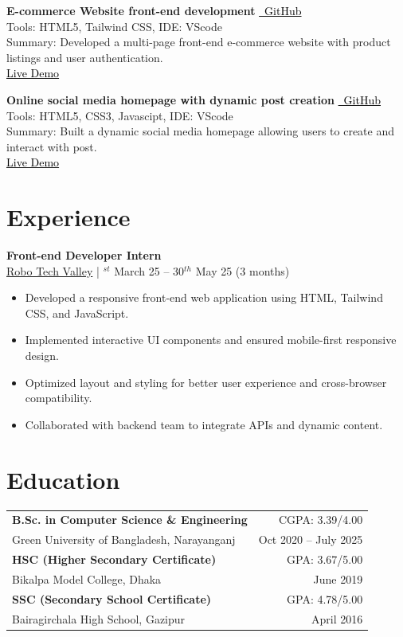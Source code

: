 \documentclass[a4paper,10pt]{article}
\newcommand{\githubbutton}[2]{%
  \colorbox{gray!20}{\href{#1}{\textcolor{black}{\faGithub\ #2}}}%
}
\newcommand{\cvsection}[2]{%
  \section*{\textcolor{blue!50!black}{#1}}\label{#2}%
  \vspace{4pt}%
}
\begin{document}
\vspace{4pt}
\textbf{E-commerce Website front-end development} 
\githubbutton{https://github.com/Nuzmolkhan/Online-Shopping-website-front-end-designing-using-html-tailwindcss}{GitHub} \\
Tools: HTML5, Tailwind CSS, IDE: VScode \\
Summary: Developed a multi-page front-end e-commerce website with product listings and user authentication. \\[2pt]
\colorbox{gray!20}{\href{https://nuzmolkhan.github.io/Online-Shopping-website-front-end-designing-using-html-tailwindcss/index.html}{\textcolor{black}{Live Demo}}}

\vspace{4pt}
\textbf{Online social media homepage with dynamic post creation} 
\githubbutton{https://github.com/Nuzmolkhan/Facebook-home-web-page-with-dynamic-post-creation}{GitHub} \\
Tools: HTML5, CSS3, Javascipt, IDE: VScode \\
Summary: Built a dynamic social media homepage allowing users to create and interact with post. \\[2pt]
\colorbox{gray!20}{\href{https://nuzmolkhan.github.io/Facebook-home-web-page-with-dynamic-post-creation/}{\textcolor{black}{Live Demo}}}

\cvsection{Experience}{sec:experience}

\textbf{Front-end Developer Intern} \\
\colorbox{gray!20}{\href{https://robotechvalley.com/}{Robo Tech Valley}} \; | $^{st}$
 March 25 -- 30$^{th}$ May 25 (3 months) \\
\begin{itemize}
  \item Developed a responsive front-end web application using HTML, Tailwind CSS, and JavaScript.
  \item Implemented interactive UI components and ensured mobile-first responsive design.
  \item Optimized layout and styling for better user experience and cross-browser compatibility.
  \item Collaborated with backend team to integrate APIs and dynamic content.
\end{itemize}

\cvsection{Education}{sec:education}

\begin{tabular}{p{12cm} r}
\textbf{B.Sc. in Computer Science \& Engineering} & CGPA: 3.39/4.00 \\
Green University of Bangladesh, Narayanganj & Oct 2020 -- July 2025 \\[2mm]
\textbf{HSC (Higher Secondary Certificate)} & GPA: 3.67/5.00 \\
Bikalpa Model College, Dhaka & June 2019 \\[2mm]
\textbf{SSC (Secondary School Certificate)} & GPA: 4.78/5.00 \\
Bairagirchala High School, Gazipur & April 2016 \\
\end{tabular}
\end{document}
